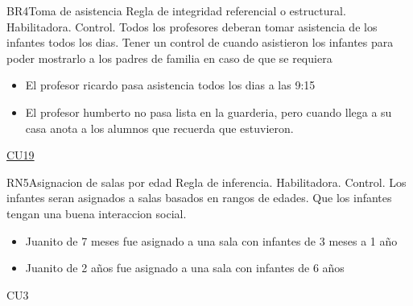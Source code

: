 \begin{BussinesRule}{BR4}{Toma de asistencia}
	\BRitem[Tipo:] Regla de integridad referencial o estructural.
	\BRitem[Clase:] Habilitadora. 
	\BRitem[Nivel:] Control. %
	\BRitem[Descripción:] Todos los profesores deberan tomar asistencia de los infantes todos los dias.
        \BRitem[Motivacion] Tener un control de cuando asistieron los infantes para poder mostrarlo a los padres de familia en caso de que se requiera
        
            \begin{itemize}
                \item El profesor ricardo pasa asistencia todos los dias a las 9:15
            \end{itemize}
	
	       \begin{itemize}
	           \item  El profesor humberto no pasa lista en la guarderia, pero cuando llega a su casa anota a los alumnos que recuerda que estuvieron.
	       \end{itemize}
	 \hyperlink{CU19}{CU19} 
\end{BussinesRule}

\begin{BussinesRule}{RN5}{Asignacion de salas por edad}
	\BRitem[Tipo:] Regla de inferencia.
	\BRitem[Clase:] Habilitadora. 
	\BRitem[Nivel:] Control. %
	\BRitem[Descripción:] Los infantes seran asignados a salas basados en rangos de edades.
        \BRitem[Motivacion] Que los infantes tengan una buena interaccion social.
		
	        \begin{itemize}
	            \item Juanito de 7 meses fue asignado a una sala con infantes de 3 meses a 1 año 
	        \end{itemize}
	        \begin{itemize}
	            \item Juanito de 2 años fue asignado a una sala con infantes de 6 años
	        \end{itemize}
	CU3 
\end{BussinesRule}


